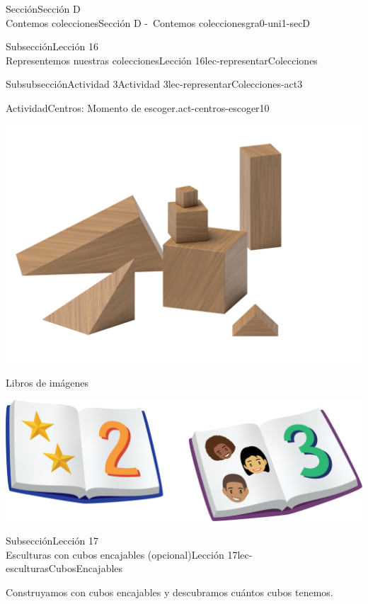 \begin{sectionptx}{Sección}{{\Large Sección D\\}Contemos colecciones}{}{Sección D -~Contemos colecciones}{}{}{gra0-uni1-secD}
\begin{subsectionptx}{Subsección}{{\normalsize Lección 16\\[-0.05cm]}Representemos nuestras colecciones}{}{Lección 16}{}{}{lec-representarColecciones}
\begin{subsubsectionptx}{Subsubsección}{Actividad 3}{}{Actividad 3}{}{}{lec-representarColecciones-act3}
\begin{activity}{Actividad}{Centros: Momento de escoger.}{act-centros-escoger10}
\begin{sidebyside}{2}{0.025}{0.025}{0.05}
\begin{sbspanel}{0.45}
\includegraphics[max width=\linewidth, center]{external/png-source/K.1.A Beta Student Workbook.Geoblocks.png}
\end{sbspanel}%
\begin{sbspanel}{0.45}%
Libros de imágenes%
\par
\includegraphics[max width=\linewidth, center]{external/png-source/K.1.D Beta Student Workbooks.Books.png}
\end{sbspanel}%
\end{sidebyside}%
\end{activity}%
\end{subsubsectionptx}
\end{subsectionptx}
%
%
\typeout{************************************************}
\typeout{************************************************}
%
\begin{subsectionptx}{Subsección}{{\normalsize Lección 17\\[-0.05cm]}Esculturas con cubos encajables (opcional)}{}{Lección 17}{}{}{lec-esculturasCubosEncajables}
\begin{introduction}{}%
Construyamos con cubos encajables y descubramos cuántos cubos tenemos.%
\end{introduction}%

\end{subsectionptx}
\end{sectionptx}
